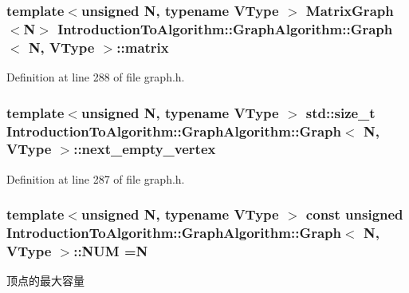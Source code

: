 \subsubsection[{matrix}]{\setlength{\rightskip}{0pt plus 5cm}template$<$unsigned N, typename V\+Type $>$ {\bf Matrix\+Graph}$<$N$>$ {\bf Introduction\+To\+Algorithm\+::\+Graph\+Algorithm\+::\+Graph}$<$ N, V\+Type $>$\+::matrix}\label{struct_introduction_to_algorithm_1_1_graph_algorithm_1_1_graph_a498323460ec613f12e1039afdca6c10a}


Definition at line 288 of file graph.\+h.

\hypertarget{struct_introduction_to_algorithm_1_1_graph_algorithm_1_1_graph_a07a8f2eafc8175787a6ce1f26f1252d0}{}
\subsubsection[{next\+\_\+empty\+\_\+vertex}]{\setlength{\rightskip}{0pt plus 5cm}template$<$unsigned N, typename V\+Type $>$ std\+::size\+\_\+t {\bf Introduction\+To\+Algorithm\+::\+Graph\+Algorithm\+::\+Graph}$<$ N, V\+Type $>$\+::next\+\_\+empty\+\_\+vertex}\label{struct_introduction_to_algorithm_1_1_graph_algorithm_1_1_graph_a07a8f2eafc8175787a6ce1f26f1252d0}


Definition at line 287 of file graph.\+h.

\hypertarget{struct_introduction_to_algorithm_1_1_graph_algorithm_1_1_graph_aba53db2c8cade306553fc1e03f138aa2}{}
\subsubsection[{N\+U\+M}]{\setlength{\rightskip}{0pt plus 5cm}template$<$unsigned N, typename V\+Type $>$ const unsigned {\bf Introduction\+To\+Algorithm\+::\+Graph\+Algorithm\+::\+Graph}$<$ N, V\+Type $>$\+::N\+U\+M =N\hspace{0.3cm}{\ttfamily [static]}}\label{struct_introduction_to_algorithm_1_1_graph_algorithm_1_1_graph_aba53db2c8cade306553fc1e03f138aa2}
顶点的最大容量 

